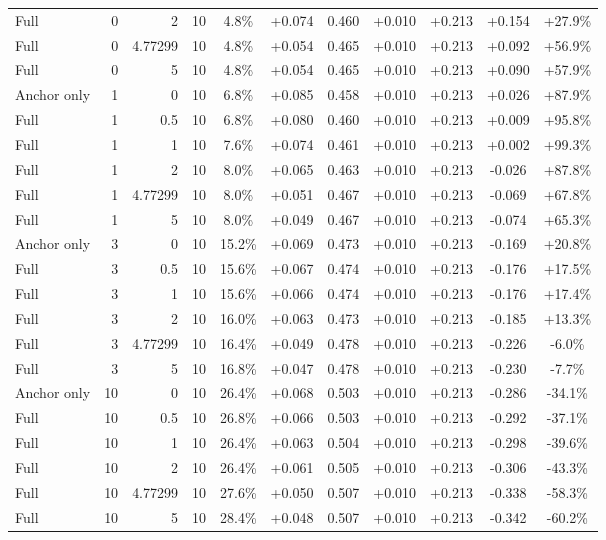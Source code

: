 \begin{table}[htbp]
\begin{tabular}{lrrrccccccc}
Full & 0 & 2 & 10 & 4.8\% & +0.074 & 0.460 & +0.010 & +0.213 & +0.154 & +27.9\% \\
Full & 0 & 4.77299 & 10 & 4.8\% & +0.054 & 0.465 & +0.010 & +0.213 & +0.092 & +56.9\% \\
Full & 0 & 5 & 10 & 4.8\% & +0.054 & 0.465 & +0.010 & +0.213 & +0.090 & +57.9\% \\
Anchor only & 1 & 0 & 10 & 6.8\% & +0.085 & 0.458 & +0.010 & +0.213 & +0.026 & +87.9\% \\
Full & 1 & 0.5 & 10 & 6.8\% & +0.080 & 0.460 & +0.010 & +0.213 & +0.009 & +95.8\% \\
Full & 1 & 1 & 10 & 7.6\% & +0.074 & 0.461 & +0.010 & +0.213 & +0.002 & +99.3\% \\
Full & 1 & 2 & 10 & 8.0\% & +0.065 & 0.463 & +0.010 & +0.213 & -0.026 & +87.8\% \\
Full & 1 & 4.77299 & 10 & 8.0\% & +0.051 & 0.467 & +0.010 & +0.213 & -0.069 & +67.8\% \\
Full & 1 & 5 & 10 & 8.0\% & +0.049 & 0.467 & +0.010 & +0.213 & -0.074 & +65.3\% \\
Anchor only & 3 & 0 & 10 & 15.2\% & +0.069 & 0.473 & +0.010 & +0.213 & -0.169 & +20.8\% \\
Full & 3 & 0.5 & 10 & 15.6\% & +0.067 & 0.474 & +0.010 & +0.213 & -0.176 & +17.5\% \\
Full & 3 & 1 & 10 & 15.6\% & +0.066 & 0.474 & +0.010 & +0.213 & -0.176 & +17.4\% \\
Full & 3 & 2 & 10 & 16.0\% & +0.063 & 0.473 & +0.010 & +0.213 & -0.185 & +13.3\% \\
Full & 3 & 4.77299 & 10 & 16.4\% & +0.049 & 0.478 & +0.010 & +0.213 & -0.226 & -6.0\% \\
Full & 3 & 5 & 10 & 16.8\% & +0.047 & 0.478 & +0.010 & +0.213 & -0.230 & -7.7\% \\
Anchor only & 10 & 0 & 10 & 26.4\% & +0.068 & 0.503 & +0.010 & +0.213 & -0.286 & -34.1\% \\
Full & 10 & 0.5 & 10 & 26.8\% & +0.066 & 0.503 & +0.010 & +0.213 & -0.292 & -37.1\% \\
Full & 10 & 1 & 10 & 26.4\% & +0.063 & 0.504 & +0.010 & +0.213 & -0.298 & -39.6\% \\
Full & 10 & 2 & 10 & 26.4\% & +0.061 & 0.505 & +0.010 & +0.213 & -0.306 & -43.3\% \\
Full & 10 & 4.77299 & 10 & 27.6\% & +0.050 & 0.507 & +0.010 & +0.213 & -0.338 & -58.3\% \\
Full & 10 & 5 & 10 & 28.4\% & +0.048 & 0.507 & +0.010 & +0.213 & -0.342 & -60.2\% \\

\end{tabular}
\end{table}
